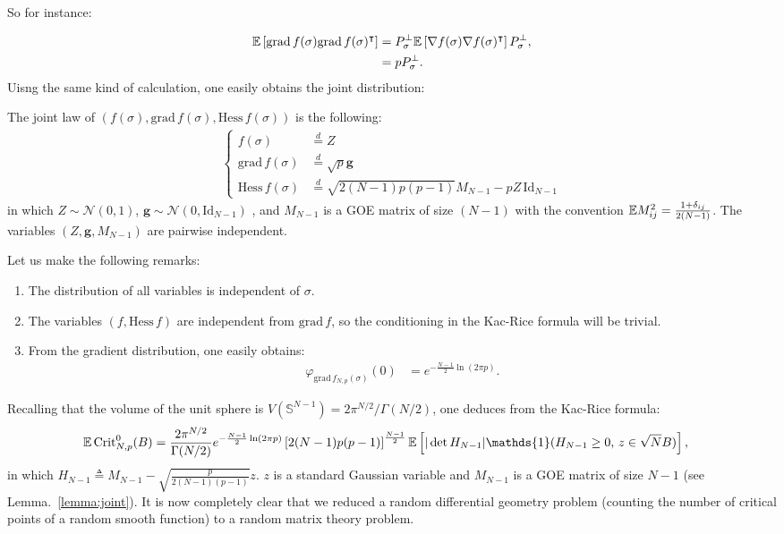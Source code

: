 \documentclass[amsmath,amssymb,nofootinbib,prd]{article}
\begin{document}
	So for instance:
	
	\begin{align*}
	\mathbb{E} \left[\mathrm{grad}\, f(\sigma) \mathrm{grad}\, f(\sigma)^\intercal \right] &=  P_\sigma^\perp\mathbb{E} \left[\nabla f(\sigma) \nabla f(\sigma)^\intercal \right] P_\sigma^\perp, \\
	&= p  P_\sigma^\perp.
	\end{align*}
	Uisng the same kind of calculation, one easily obtains the joint distribution:
	\begin{lemma}\label{lemma:joint}
	The joint law of $(f(\sigma),\mathrm{grad}\, f(\sigma),\mathrm{Hess}\, f(\sigma))$ is the following:
	\begin{align}
	\begin{cases}
	f(\sigma) &\overset{d}{=} Z \\
	\mathrm{grad}\, f(\sigma) &\overset{d}{=} \sqrt{p} \bm{g} \\
	\mathrm{Hess}\, f(\sigma) &\overset{d}{=} \sqrt{2 (N-1)p(p-1)} M_{N-1} - p Z \, \mathrm{Id}_{N-1}
	\end{cases}
	\end{align}
	in which $Z \sim \mathcal{N}(0,1)$, $\bm{g} \sim \mathcal{N}(0,\mathrm{Id}_{N-1})$ , and $M_{N-1}$ is a GOE matrix of size $(N-1)$ with the convention $\mathbb{E} M_{ij}^2 = \frac{1+\delta_{ij}}{2(N-1)}$. The variables $(Z,\bm{g},M_{N-1})$ are pairwise independent.
	\end{lemma}
	
	Let us make the following remarks:
	\begin{enumerate}
	\item The distribution of all variables is independent of $\sigma$.
	\item The variables $(f,\mathrm{Hess}\, f)$ are independent from $\mathrm{grad}\,f$, so the conditioning in the Kac-Rice formula will be trivial.
	\item From the gradient distribution, one easily obtains:
	\begin{align*}
	 \varphi_{\mathrm{grad}\, f_{N,p}(\sigma)}(0) &= e^{- \frac{N-1}{2} \ln (2 \pi p)}.
	\end{align*}
	\end{enumerate}
	
	Recalling that the volume of the unit sphere is $V(\mathbb{S}^{N-1}) = 2 \pi^{N/2} / \Gamma(N/2)$, one deduces from the Kac-Rice formula:
	\begin{align}\label{eq:0}
	\EE \, \mathrm{Crit}_{N,p}^0(B) &= \frac{2 \pi^{N/2}}{\Gamma(N/2)}e^{- \frac{N-1}{2} \ln (2 \pi p)} \left[2 (N-1)p(p-1)\right]^{\frac{N-1}{2}} \EE \left[|\det H_{N-1}| \mathds{1}(H_{N-1} \geq 0, \, z \in \sqrt{N} B)\right],
	\end{align}
	in which $H_{N-1} \triangleq M_{N-1} - \sqrt{\frac{p}{2 (N-1)(p-1)}} z$. $z$ is a standard Gaussian variable and $M_{N-1}$ is a GOE matrix of size $N-1$ (see Lemma.~\ref{lemma:joint}). It is now completely clear that we reduced a random differential geometry problem (counting the number of critical points of a random smooth function) to a random matrix theory problem. 
	
\end{document}
